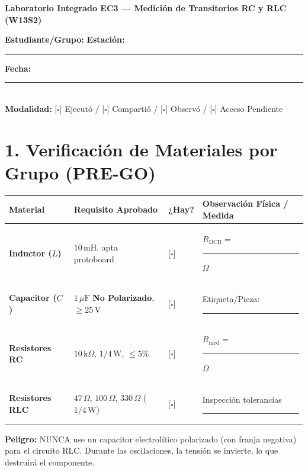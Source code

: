 \documentclass[11pt, a4paper]{article}
\begin{document}
\begin{tcolorbox}[colback=warnred!5!white, colframe=warnred, title=\textbf{Pauta Experimental Estricta: NO ENERGIZAR SIN "GO" DOCUMENTADO}]
    \centering \textbf{Laboratorio Integrado EC3 — Medición de Transitorios RC y RLC (W13S2)}
\end{tcolorbox}

\noindent\textbf{Estudiante/Grupo:} \hrulefill \quad \textbf{Estación:} \rule{2cm}{0.4pt} \quad \textbf{Fecha:} \rule{2.5cm}{0.4pt} \\
\textbf{Modalidad:} [$\square$] Ejecutó / [$\square$] Compartió / [$\square$] Observó / [$\square$] Acceso Pendiente

\section*{1. Verificación de Materiales por Grupo (PRE-GO)}
\renewcommand{\arraystretch}{1.5}
\noindent
\begin{tabularx}{\textwidth}{>{\bfseries\RaggedRight\hsize=0.8\hsize}X >{\RaggedRight\arraybackslash\hsize=1.2\hsize}X >{\centering\arraybackslash\hsize=0.5\hsize}X >{\RaggedRight\arraybackslash\hsize=1.5\hsize}X}
\toprule
\textbf{Material} & \textbf{Requisito Aprobado} & \textbf{¿Hay?} & \textbf{Observación Física / Medida} \\
\midrule
Inductor ($L$) & $10\,\text{mH}$, apta protoboard & {[$\square$]} & $R_{\text{DCR}} = $ \rule{1.5cm}{0.4pt} $\Omega$ \\
Capacitor ($C$) & $1\,\mu\text{F}$ \textbf{No Polarizado}, $\ge 25\,\text{V}$ & {[$\square$]} & Etiqueta/Pieza: \rule{2.5cm}{0.4pt} \\
Resistores RC & $10\,\text{k}\Omega$, $1/4\,\text{W}$, $\le 5\%$ & {[$\square$]} & $R_{\text{med}} = $ \rule{2cm}{0.4pt} $\Omega$ \\
Resistores RLC & $47\,\Omega$, $100\,\Omega$, $330\,\Omega$ ($1/4\,\text{W}$) & {[$\square$]} & Inspección tolerancias \rule{1.5cm}{0.4pt} \\
\bottomrule
\end{tabularx}

\vspace{0.2cm}
\begin{tcolorbox}[colback=white, colframe=black, boxsep=2pt, left=4pt, right=4pt, top=2pt, bottom=2pt]
\small\textbf{Peligro:} NUNCA use un capacitor electrolítico polarizado (con franja negativa) para el circuito RLC. Durante las oscilaciones, la tensión se invierte, lo que destruirá el componente.
\end{tcolorbox}
\end{document}
